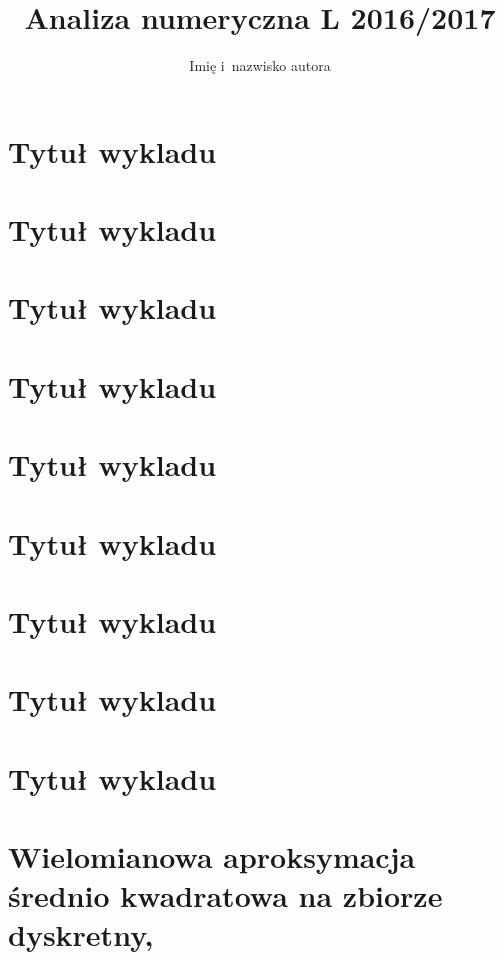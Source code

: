 \documentclass[polish]{kbk}
\begin{document}
\author{Imię i~nazwisko autora}
\title{Analiza numeryczna L 2016/2017}



\maketitle

\section{Tytuł wykladu}
\section{Tytuł wykladu}
\section{Tytuł wykladu}
\section{Tytuł wykladu}
\section{Tytuł wykladu}
\section{Tytuł wykladu}
\section{Tytuł wykladu}
\section{Tytuł wykladu}
\section{Tytuł wykladu}



\section{Wielomianowa aproksymacja średnio kwadratowa na zbiorze dyskretny,}
\end{document}
